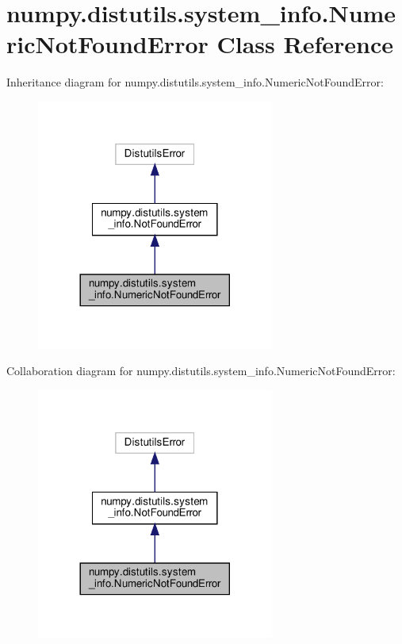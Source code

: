 \hypertarget{classnumpy_1_1distutils_1_1system__info_1_1NumericNotFoundError}{}\section{numpy.\+distutils.\+system\+\_\+info.\+Numeric\+Not\+Found\+Error Class Reference}
\label{classnumpy_1_1distutils_1_1system__info_1_1NumericNotFoundError}


Inheritance diagram for numpy.\+distutils.\+system\+\_\+info.\+Numeric\+Not\+Found\+Error\+:
\nopagebreak
\begin{figure}[H]
\begin{center}
\leavevmode
\includegraphics[width=221pt]{classnumpy_1_1distutils_1_1system__info_1_1NumericNotFoundError__inherit__graph}
\end{center}
\end{figure}


Collaboration diagram for numpy.\+distutils.\+system\+\_\+info.\+Numeric\+Not\+Found\+Error\+:
\nopagebreak
\begin{figure}[H]
\begin{center}
\leavevmode
\includegraphics[width=221pt]{classnumpy_1_1distutils_1_1system__info_1_1NumericNotFoundError__coll__graph}
\end{center}
\end{figure}


